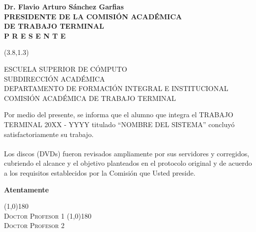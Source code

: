 \documentclass[11pt]{brownletter}
\date{México, D.F. a 8 de Enero de 2016\\} %
\begin{document}
\begin{letter}{\normalsize{\textbf{ Dr. Flavio Arturo Sánchez Garfias\\
		PRESIDENTE DE LA COMISIÓN ACADÉMICA \\ DE TRABAJO TERMINAL\\
		P R E S E N T E}}}

\opening{ }
\begin{textblock}{8}(3.8,1.3)
\begin{center}
	ESCUELA SUPERIOR DE CÓMPUTO \\
SUBDIRECCIÓN ACADÉMICA \\
DEPARTAMENTO DE FORMACIÓN INTEGRAL E
INSTITUCIONAL\\
COMISIÓN ACADÉMICA DE TRABAJO TERMINAL
\end{center}
\end{textblock}
 \vspace*{1cm}

Por medio del presente, se informa que el alumno que integra el TRABAJO
TERMINAL 20XX - YYYY titulado “NOMBRE DEL SISTEMA” concluyó satisfactoriamente su trabajo. \\\\
Los discos (DVDs) fueron revisados ampliamente por sus servidores y corregidos, cubriendo el alcance y el objetivo planteados en el protocolo original y de acuerdo a los requisitos establecidos por la Comisión que Usted preside.
\vspace*{1.5cm}
\closing{\textbf{Atentamente}}
\vspace*{4.5cm}
\begin{center}
		\begin{multicols}{2}
		\line(1,0){180}\\		
		\textsc{Doctor Profesor 1} \columnbreak \vfill
		\line(1,0){180}\\
	\textsc{Doctor Profesor 2} \\
	\end{multicols}
\end{center}
 
\end{letter}
\end{document}
